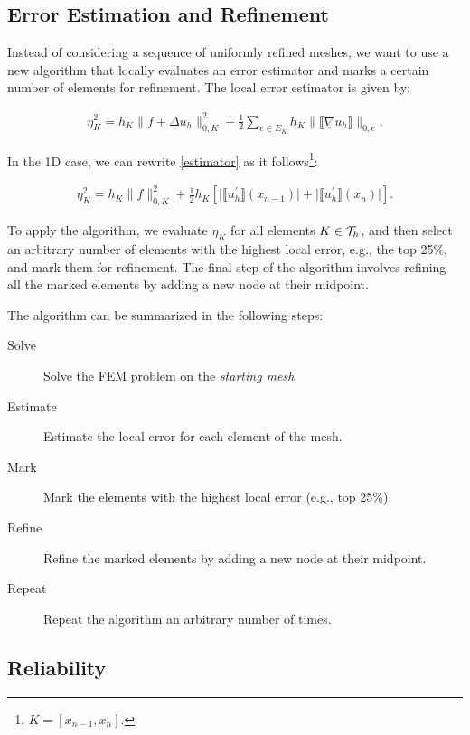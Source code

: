 \subsection{Error Estimation and Refinement}

Instead of considering a sequence of uniformly refined meshes, we want to use a new algorithm that locally evaluates an error estimator and marks a certain number of elements for refinement. The local error estimator is given by:

\begin{gather} \label{estimator}
	\eta_K^2 = h_K \lVert f + \Delta u_h \rVert_{0, K}^2 + \frac{1}{2} \sum_{e \in E_K} h_K \lVert \llbracket \underline{\nabla} u_h \rrbracket \rVert_{0, e}.
\end{gather}

In the 1D case, we can rewrite \ref{estimator} as it follows\footnote{$K = [x_{n - 1}, x_n]$.}:

\begin{gather}
	\eta_K^2 = h_K \lVert f \rVert_{0, K}^2 + \frac{1}{2} h_K \left[ \lvert \llbracket u_h^\prime \rrbracket (x_{n - 1}) \rvert + \lvert \llbracket u_h^\prime \rrbracket (x_n) \rvert \right].
\end{gather}

To apply the algorithm, we evaluate $\eta_K$ for all elements $K \in \mathcal{T}_h$, and then select an arbitrary number of elements with the highest local error, e.g., the top 25\%, and mark them for refinement. The final step of the algorithm involves refining all the marked elements by adding a new node at their midpoint.

The algorithm can be summarized in the following steps:

\begin{description}
	\item[Solve] Solve the FEM problem on the \textit{starting mesh}.
	\item[Estimate] Estimate the local error for each element of the mesh.
	\item[Mark] Mark the elements with the highest local error (e.g., top 25\%).
	\item[Refine] Refine the marked elements by adding a new node at their midpoint.  
	\item[Repeat] Repeat the algorithm an arbitrary number of times. 
\end{description}

\newpage
\subsection{Reliability}

